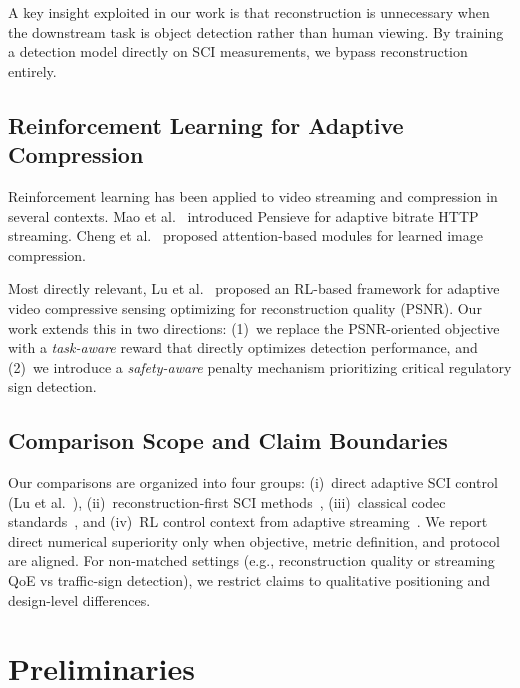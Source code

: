 \documentclass[10pt,journal]{IEEEtran}
\begin{document}
A key insight exploited in our work is that reconstruction is unnecessary when the downstream task is object detection rather than human viewing. By training a detection model directly on SCI measurements, we bypass reconstruction entirely.

\subsection{Reinforcement Learning for Adaptive Compression}

Reinforcement learning has been applied to video streaming and compression in several contexts. Mao et al.~\cite{mao2017pensieve} introduced Pensieve for adaptive bitrate HTTP streaming. Cheng et al.~\cite{cheng2020learned} proposed attention-based modules for learned image compression.

Most directly relevant, Lu et al.~\cite{lu2021rlsci} proposed an RL-based framework for adaptive video compressive sensing optimizing for reconstruction quality (PSNR). Our work extends this in two directions: (1)~we replace the PSNR-oriented objective with a \emph{task-aware} reward that directly optimizes detection performance, and (2)~we introduce a \emph{safety-aware} penalty mechanism prioritizing critical regulatory sign detection.

\subsection{Comparison Scope and Claim Boundaries}

Our comparisons are organized into four groups: (i)~direct adaptive SCI control (Lu et al.~\cite{lu2021rlsci}), (ii)~reconstruction-first SCI methods~\cite{liu2019cacti,ma2019deep}, (iii)~classical codec standards~\cite{sullivan2012hevc}, and (iv)~RL control context from adaptive streaming~\cite{mao2017pensieve}. We report direct numerical superiority only when objective, metric definition, and protocol are aligned. For non-matched settings (e.g., reconstruction quality or streaming QoE vs traffic-sign detection), we restrict claims to qualitative positioning and design-level differences.



\section{Preliminaries}
\end{document}
